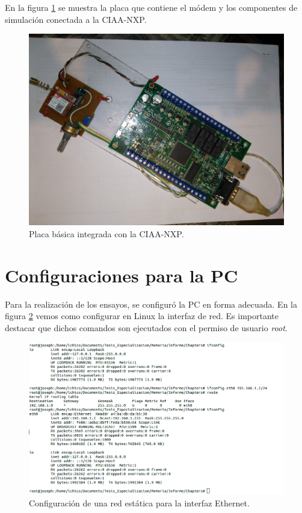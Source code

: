 En la figura \ref{fig:prototipo} se muestra la placa que contiene el módem y los componentes de simulación conectada a la CIAA-NXP. 

\begin{figure}[h]
  \centering
  \includegraphics[scale=.1]{./Figures/prototipo.jpg}
  \caption{Placa básica integrada con la CIAA-NXP.}
  \label{fig:prototipo}
\end{figure}

\section{Configuraciones para la PC}

Para la realización de los ensayos, se configuró la PC en forma adecuada. En la figura \ref{fig:hw_pc} vemos como configurar en Linux la interfaz de red. Es importante destacar que dichos comandos son ejecutados con el permiso de usuario \emph{root}.

\begin{figure}[h]
  \centering
  \includegraphics[scale=.45]{./Figures/config_net_console.png}
  \caption{Configuración de una red estática para la interfaz Ethernet.}
  \label{fig:hw_pc}
\end{figure}

